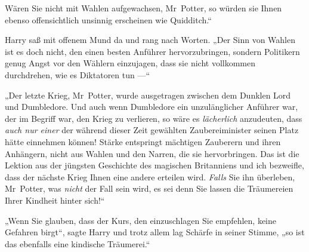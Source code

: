 Wären Sie nicht mit Wahlen aufgewachsen, Mr~Potter, so würden sie Ihnen ebenso offensichtlich unsinnig erscheinen wie Quidditch.“

Harry saß mit offenem Mund da und rang nach Worten.
„Der Sinn von Wahlen ist es doch nicht, den einen besten Anführer hervorzubringen, sondern Politikern genug Angst vor den Wählern einzujagen, dass sie nicht vollkommen durchdrehen, wie es Diktatoren tun —“

„Der letzte Krieg, Mr~Potter, wurde ausgetragen zwischen dem Dunklen Lord und Dumbledore. Und auch wenn Dumbledore ein unzulänglicher Anführer war, der im Begriff war, den Krieg zu verlieren, so wäre es \emph{lächerlich} anzudeuten, dass \emph{auch nur einer} der während dieser Zeit gewählten Zaubereiminister seinen Platz hätte einnehmen können! Stärke entspringt mächtigen Zauberern und ihren Anhängern, nicht aus Wahlen und den Narren, die sie hervorbringen. Das ist die Lektion aus der jüngsten Geschichte des magischen Britanniens und ich bezweifle, dass der nächste Krieg Ihnen eine andere erteilen wird. \emph{Falls} Sie ihn überleben, Mr~Potter, was \emph{nicht} der Fall sein wird, es sei denn Sie lassen die Träumereien Ihrer Kindheit hinter sich!“

„Wenn Sie glauben, dass der Kurs, den einzuschlagen Sie empfehlen, keine Gefahren birgt“, sagte Harry und trotz allem lag Schärfe in seiner Stimme, „so ist das ebenfalls eine kindische Träumerei.“

